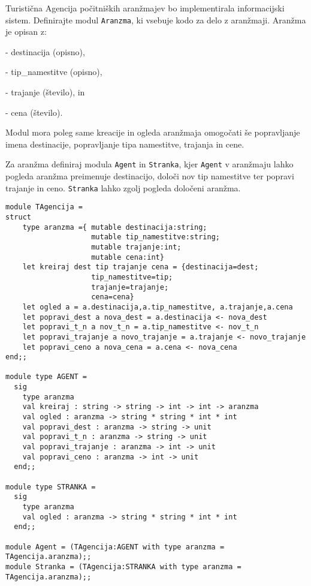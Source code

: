 \begin{ex}
Turisti\v cna Agencija po\v citni\v skih aran\v zmajev bo implementirala
informacijski sistem.
Definirajte modul \lstinline{Aranzma}, ki vsebuje kodo za delo z
aran\v zmaji. Aran\v zma je opisan z:

- destinacija (opisno), 

- tip\_namestitve (opisno), 

- trajanje (\v stevilo), in 

- cena (\v stevilo).

Modul mora poleg same kreacije in ogleda aran\v zmaja omogo\v cati \v se
popravljanje imena destinacije, popravljanje tipa namestitve, trajanja
in cene.

Za aran\v zma definiraj modula \lstinline{Agent} in \lstinline{Stranka}, kjer \lstinline{Agent} v aran\v zmaju
lahko pogleda aran\v zma preimenuje destinacijo, dolo\v ci nov tip
namestitve ter popravi trajanje in ceno. \lstinline{Stranka} lahko zgolj pogleda
dolo\v ceni aran\v zma.

\begin{sol}

\begin{lstlisting}
module TAgencija = 
struct
    type aranzma ={ mutable destinacija:string;
                    mutable tip_namestitve:string;
                    mutable trajanje:int;
                    mutable cena:int}
    let kreiraj dest tip trajanje cena = {destinacija=dest;
                    tip_namestitve=tip;
                    trajanje=trajanje;
                    cena=cena}
    let ogled a = a.destinacija,a.tip_namestitve, a.trajanje,a.cena
    let popravi_dest a nova_dest = a.destinacija <- nova_dest
    let popravi_t_n a nov_t_n = a.tip_namestitve <- nov_t_n
    let popravi_trajanje a novo_trajanje = a.trajanje <- novo_trajanje
    let popravi_ceno a nova_cena = a.cena <- nova_cena
end;;

module type AGENT =
  sig
    type aranzma
    val kreiraj : string -> string -> int -> int -> aranzma
    val ogled : aranzma -> string * string * int * int
    val popravi_dest : aranzma -> string -> unit
    val popravi_t_n : aranzma -> string -> unit
    val popravi_trajanje : aranzma -> int -> unit
    val popravi_ceno : aranzma -> int -> unit
  end;;
  
module type STRANKA =
  sig
    type aranzma
    val ogled : aranzma -> string * string * int * int
  end;;

module Agent = (TAgencija:AGENT with type aranzma = TAgencija.aranzma);;
module Stranka = (TAgencija:STRANKA with type aranzma = TAgencija.aranzma);;

\end{lstlisting}

\end{sol}

\end{ex}



